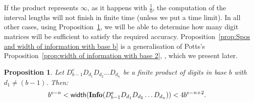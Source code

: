 \documentclass[11pt,a4paper]{article}
\newtheorem{prop}[tm]{Proposition}
\begin{document}
If the product represents $\infty$, as it happens with $\frac{1}{0}$, the
	computation of the interval lengths will not finish in finite
	time (unless we put a time limit). In all other cases, using
	Proposition~\ref{prop:Spos and width of information with base b}, we
	will be able to determine how many digit matrices will be sufficient
	to satisfy the required accuracy. Proposition~\ref{prop:Spos and
	width of information with base b} is a generalisation of Potts's
	Proposition~\ref{prop:width of information with base 2},
	\cite{pot98}, which we present later.
	\begin{prop} \label{prop:Spos and width of information with base b}
		Let $D_{b-1}^e D_{d_1} D_{d_2} \ldots D_{d_n}$ be a finite product
		of digits in base $b$ with $d_1 \ne (b-1)$.
		Then:
		\[ b^{e-n} < {\sf width} ( {\bf Info} ( D_{b-1}^e D_{d_1}
			D_{d_2} \ldots D_{d_n} ) ) < 4 b^{e-n+2}. \]
	\end{prop}
\end{document}
